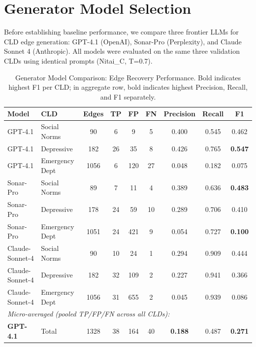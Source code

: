 \documentclass{article}
\begin{document}
\section{Generator Model Selection}

Before establishing baseline performance, we compare three frontier LLMs for CLD edge generation: GPT-4.1 (OpenAI), Sonar-Pro (Perplexity), and Claude Sonnet 4 (Anthropic). All models were evaluated on the same three validation CLDs using identical prompts (Nitai\_C, T=0.7).

\begin{table}[H]
\centering
\caption{Generator Model Comparison: Edge Recovery Performance. Bold indicates highest F1 per CLD; in aggregate row, bold indicates highest Precision, Recall, and F1 separately.}
\label{tab:generator_model_comparison}
\begin{threeparttable}
\begin{tabular}{llccccccc}
\toprule
\textbf{Model} & \textbf{CLD} & \textbf{Edges} & \textbf{TP} & \textbf{FP} & \textbf{FN} & \textbf{Precision} & \textbf{Recall} & \textbf{F1} \\
\midrule
GPT-4.1 & Social Norms & 90 & 6 & 9 & 5 & 0.400 & 0.545 & 0.462 \\
GPT-4.1 & Depressive & 182 & 26 & 35 & 8 & 0.426 & 0.765 & \textbf{0.547} \\
GPT-4.1 & Emergency Dept & 1056 & 6 & 120 & 27 & 0.048 & 0.182 & 0.075 \\
\midrule
Sonar-Pro & Social Norms & 89 & 7 & 11 & 4 & 0.389 & 0.636 & \textbf{0.483} \\
Sonar-Pro & Depressive & 178 & 24 & 59 & 10 & 0.289 & 0.706 & 0.410 \\
Sonar-Pro & Emergency Dept & 1051 & 24 & 421 & 9 & 0.054 & 0.727 & \textbf{0.100} \\
\midrule
Claude-Sonnet-4 & Social Norms & 90 & 10 & 24 & 1 & 0.294 & 0.909 & 0.444 \\
Claude-Sonnet-4 & Depressive & 182 & 32 & 109 & 2 & 0.227 & 0.941 & 0.366 \\
Claude-Sonnet-4 & Emergency Dept & 1056 & 31 & 655 & 2 & 0.045 & 0.939 & 0.086 \\
\midrule
\multicolumn{9}{l}{\textit{Micro-averaged (pooled TP/FP/FN across all CLDs):}} \\
\textbf{GPT-4.1} & Total & 1328 & 38 & 164 & 40 & \textbf{0.188} & 0.487 & \textbf{0.271} \\

\end{tabular}
\end{threeparttable}
\end{table}
\end{document}
